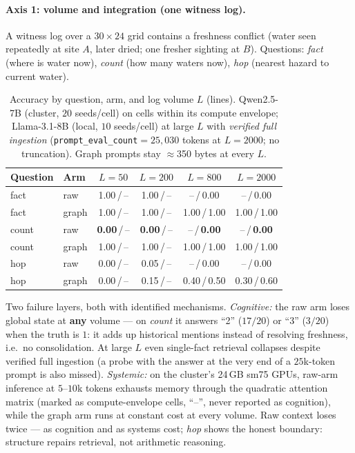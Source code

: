 \documentclass{article}
\begin{document}
\paragraph{Axis 1: volume and integration (one witness log).}
A witness log over a $30{\times}24$ grid contains a freshness conflict (water
seen repeatedly at site $A$, later dried; one fresher sighting at $B$).
Questions: \emph{fact} (where is water now), \emph{count} (how many waters
now), \emph{hop} (nearest hazard to current water).

\begin{table}[h]
\caption{Accuracy by question, arm, and log volume $L$ (lines). Qwen2.5-7B (cluster, $20$ seeds/cell) on cells within its compute envelope; Llama-3.1-8B (local, $10$ seeds/cell) at large $L$ with \emph{verified full ingestion} (\texttt{prompt\_eval\_count}${=}25{,}030$ tokens at $L{=}2000$; no truncation). Graph prompts stay $\approx$350 bytes at every $L$.}
\label{tab:ctx-axis1}
\centering
\small
\begin{tabular}{l l c c c c}
\toprule
Question & Arm & $L{=}50$ & $L{=}200$ & $L{=}800$ & $L{=}2000$ \\
\midrule
fact  & raw   & 1.00\,/\,--   & 1.00\,/\,--   & --\,/\,0.00 & --\,/\,0.00 \\
fact  & graph & 1.00\,/\,--   & 1.00\,/\,--   & 1.00\,/\,1.00 & 1.00\,/\,1.00 \\
count & raw   & \textbf{0.00}\,/\,-- & \textbf{0.00}\,/\,-- & --\,/\,\textbf{0.00} & --\,/\,\textbf{0.00} \\
count & graph & 1.00\,/\,--   & 1.00\,/\,--   & 1.00\,/\,1.00 & 1.00\,/\,1.00 \\
hop   & raw   & 0.00\,/\,--   & 0.05\,/\,--   & --\,/\,0.00 & --\,/\,0.00 \\
hop   & graph & 0.00\,/\,--   & 0.15\,/\,--   & 0.40\,/\,0.50 & 0.30\,/\,0.60 \\
\bottomrule
\end{tabular}
\end{table}

Two failure layers, both with identified mechanisms. \emph{Cognitive:} the raw
arm loses global state at \textbf{any} volume --- on \emph{count} it answers
``2'' ($17/20$) or ``3'' ($3/20$) when the truth is $1$: it adds up historical
mentions instead of resolving freshness, i.e.\ no consolidation. At large $L$
even single-fact retrieval collapses despite verified full ingestion (a probe
with the answer at the very end of a $25$k-token prompt is also missed).
\emph{Systemic:} on the cluster's 24\,GB sm75 GPUs, raw-arm inference at
$5$--$10$k tokens exhausts memory through the quadratic attention matrix
(marked as compute-envelope cells, ``--'', never reported as cognition), while
the graph arm runs at constant cost at every volume. Raw context loses twice
--- as cognition and as systems cost; \emph{hop} shows the honest boundary:
structure repairs retrieval, not arithmetic reasoning.
\end{document}
